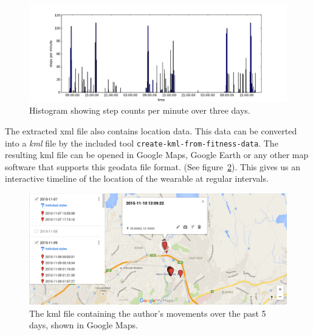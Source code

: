 \documentclass[a4paper,11pt,dvips]{article}
\begin{document}
\begin{figure}
\noindent
\includegraphics[natwidth=1355bp,natheight=512bp,width=\linewidth]{stepcount}
\caption{Histogram showing step counts per minute over three days.}
\label{fig:stepcount}
\end{figure}

The extracted xml file also contains location data. This data can be converted into a \textit{kml} file by the included tool \texttt{create-kml-from-fitness-data}. The resulting kml file can be opened in Google Maps, Google Earth or any other map software that supports this geodata file format. (See figure~\ref{fig:geodata}). This gives us an interactive timeline of the location of the wearable at regular intervals.

\begin{figure}
\noindent
\includegraphics[natwidth=2096bp,natheight=906bp,width=\linewidth]{geodata}
\caption{The kml file containing the author's movements over the past 5 days, shown in Google Maps.}
\label{fig:geodata}
\end{figure}

\pagebreak
\end{document}
